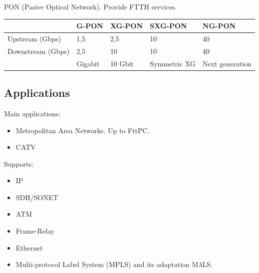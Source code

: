 \documentclass[../main.tex]{subfiles}
\begin{document}
PON (Pasive Optical Network). Provide FTTH services.

\begin{tabular}{|l|l|l|l|l|}
	\hline
						& G-PON	& XG-PON	& SXG-PON	& NG-PON \\
	\hline
	Upstream (Gbps)		& 1,5	& 2,5		& 10		& 40 \\
	\hline
	Downstream (Gbps)	& 2,5	& 10		& 10		& 40 \\
	\hline
						& Gigabit			& 10 Gbit	& Symmetric XG	& Next generation \\
	\hline
\end{tabular}

\subsection{Applications}

Main applications:

\begin{itemize}
	\item Metropolitan Area Networks. Up to FttPC.
	\item CATV
\end{itemize}

Supports:

\begin{itemize}
	\item IP
	\item SDH/SONET
	\item ATM
	\item Frame-Relay
	\item Ethernet
	\item Multi-protocol Label System (MPLS) and its adaptation M$\lambda$LS.
\end{itemize}
\end{document}
